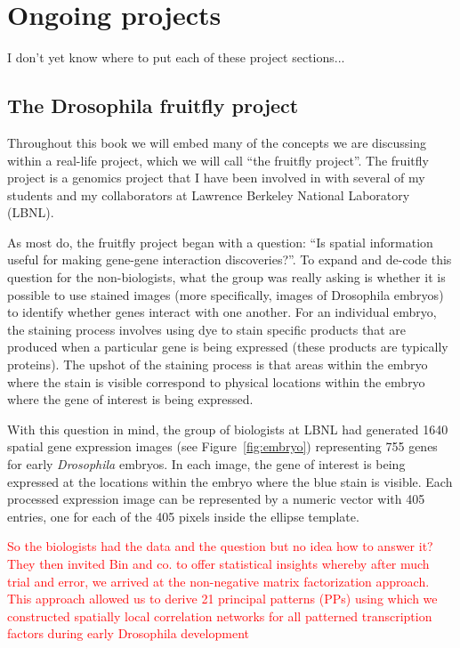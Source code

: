 

\chapter{Ongoing projects}
\label{ch:projects}

I don't yet know where to put each of these project sections...

\section{The Drosophila fruitfly project}
Throughout this book we will embed many of the concepts we are discussing within a real-life project, which we will call ``the fruitfly project''. The fruitfly project is a genomics project that I have been involved in with several of my students and my collaborators at Lawrence Berkeley National Laboratory (LBNL).

As most do, the fruitfly project began with a question: ``Is spatial information useful for making gene-gene interaction discoveries?''. To expand and de-code this question for the non-biologists, what the group was really asking is whether it is possible to use stained images (more specifically, images of Drosophila embryos) to identify whether genes interact with one another. For an individual embryo, the staining process involves using dye to stain specific products that are produced when a particular gene is being expressed (these products are typically proteins). The upshot of the staining process is that areas within the embryo where the stain is visible correspond to physical locations within the embryo where the gene of interest is being expressed. 



With this question in mind, the group of biologists at LBNL had generated 1640 spatial gene expression images (see Figure~\ref{fig:embryo}) representing 755 genes for early \emph{Drosophila} embryos. In each image, the gene of interest is being expressed at the locations within the embryo where the blue stain is visible. Each processed expression image can be represented by a numeric vector with 405 entries, one for each of the 405 pixels inside the ellipse template.





\textcolor{red}{So the biologists had the data and the question but no idea how to answer it? They then invited Bin and co. to offer statistical insights whereby after much trial and error, we arrived at the non-negative matrix factorization approach. This approach allowed us to derive 21 principal patterns (PPs) using which we constructed spatially local correlation networks for all patterned transcription factors during early Drosophila development}

